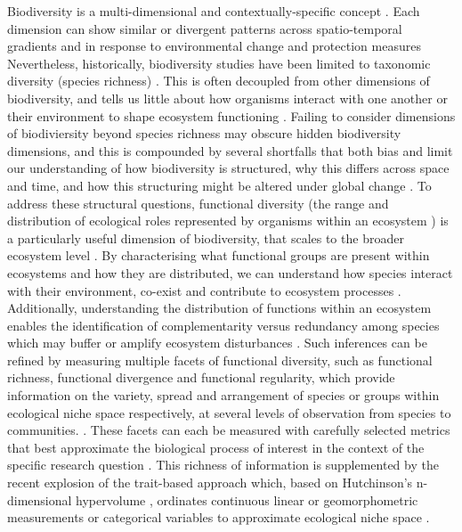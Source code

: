 \documentclass[11pt]{report}
\begin{document}
Biodiversity is a multi-dimensional and contextually-specific concept \citep{Domisch2025}. 
Each dimension can show similar or divergent patterns across spatio-temporal gradients and in response to environmental change and protection measures\citep[e.g.,][]{Hhn2024, JARZYNA20231153, Parker2026, VIGUESJORBA2025113855}
Nevertheless, historically, biodiversity studies have been limited to taxonomic diversity (species richness) \citep{purvis2019global}.
This is often decoupled from other dimensions of biodiversity, and tells us little about how organisms interact with one another or their environment to shape ecosystem functioning \citep{article}. 
Failing to consider dimensions of biodiviersity beyond species richness may obscure hidden biodiversity dimensions, and this is compounded by several shortfalls that both bias and limit our understanding of how biodiversity is structured, why this differs across space and time, and how this structuring might be altered under global change \citep{Hortal2015, Domisch2025}.
To address these structural questions, functional diversity (the range and distribution of ecological roles represented by organisms within an ecosystem \citep{Petchey2006}) is a particularly useful dimension of biodiversity, that scales to the broader ecosystem level \citep{Pavoine2011, Cooke2019, Marino2025}.
By characterising what functional groups are present within ecosystems and how they are distributed, we can understand how species interact with their environment, co-exist and contribute to ecosystem processes \citep{doi:10.1126/science.277.5330.1300, GOMESGONCALVES2024108818}.
Additionally, understanding the distribution of functions within an ecosystem enables the identification of complementarity versus redundancy among species which may buffer or amplify ecosystem disturbances \citep{doi:10.1073/pnas.2531790123, Germain2023}.
Such inferences can be refined by measuring multiple facets of functional diversity, such as functional richness, functional divergence and functional regularity, which provide information on the variety, spread and arrangement of species or groups within ecological niche space respectively, at several levels of observation from species to communities. \citep{Tucker2017, Mammola2021,Dias2025, Guillerme2025}.
These facets can each be measured with carefully selected metrics that best approximate the biological process of interest in the context of the specific research question \citep{Mammola2021, Guillerme2025}.
This richness of information is supplemented by the recent explosion of the trait-based approach which, based on Hutchinson's n-dimensional hypervolume \citep{hutchinson1957population}, ordinates continuous linear or geomorphometric measurements or categorical variables to approximate ecological niche space \citep{Blonder2018,Guillerme2020,Mammola2021,article}.
\end{document}
